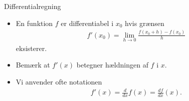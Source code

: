 \begin{frame}{Differentialregning}
\begin{itemize}
			\setlength\itemsep{1em}
	\item<1-> En funktion $f$ er differentiabel i $x_0$ hvis grænsen
	\begin{align*}
	f'(x_0)=\lim_{h\to 0}\frac{f(x_0+h)-f(x_0)}{h}
	\end{align*}
	eksisterer.
	\item<2-> Bemærk at $f'(x)$ betegner hældningen af $f$ i $x$.
	\item<3-> Vi anvender ofte notationen
	\begin{align*}
	f'(x)=\frac{d}{dx} f(x)=\frac{df}{dx}(x).
	\end{align*}
\end{itemize}
\end{frame}

